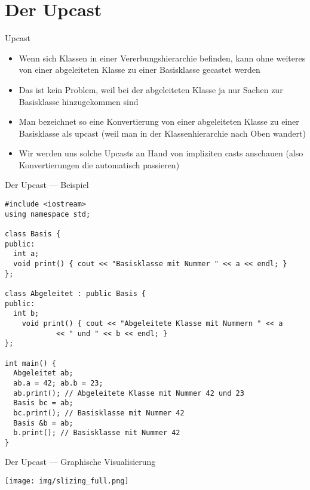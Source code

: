 \documentclass[presentation]{beamer}
\begin{document}
\section{Der Upcast}
\label{sec:org441429a}
\begin{frame}[label={sec:org52ca310}]{Upcast}
\begin{itemize}
\item Wenn sich Klassen in einer Vererbungshierarchie befinden, kann ohne
weiteres von einer abgeleiteten Klasse zu einer Basisklasse gecastet
werden
\item Das ist kein Problem, weil bei der abgeleiteten Klasse ja nur Sachen
zur Basisklasse hinzugekommen sind
\item Man bezeichnet so eine Konvertierung von einer abgeleiteten Klasse
zu einer Basisklasse als \alert{upcast} (weil man in der Klassenhierarchie
nach Oben wandert)
\item Wir werden uns solche Upcasts an Hand von impliziten casts anschauen
(also Konvertierungen die automatisch passieren)
\end{itemize}
\end{frame}
\begin{frame}[label={sec:org77db962},fragile]{Der Upcast --- Beispiel}
 \begin{verbatim}
#include <iostream>
using namespace std;

class Basis {
public:
  int a;
  void print() { cout << "Basisklasse mit Nummer " << a << endl; }
};

class Abgeleitet : public Basis {
public:
  int b;
    void print() { cout << "Abgeleitete Klasse mit Nummern " << a
			<< " und " << b << endl; }
};

int main() {
  Abgeleitet ab;
  ab.a = 42; ab.b = 23;
  ab.print(); // Abgeleitete Klasse mit Nummer 42 und 23
  Basis bc = ab;
  bc.print(); // Basisklasse mit Nummer 42
  Basis &b = ab;
  b.print(); // Basisklasse mit Nummer 42
}
\end{verbatim}
\end{frame}
\begin{frame}[label={sec:org8f7b0ea}]{Der Upcast --- Graphische Visualisierung}
\begin{center}
\texttt{[image: img/slizing\_full.png]}
\end{center}
\end{frame}
\end{document}
